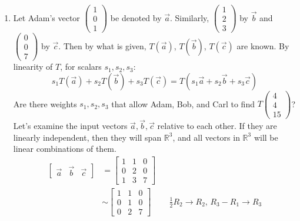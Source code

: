 \documentclass[10pt,letterpaper,final]{report}
\newcommand{\reason}[1]{&& \text{#1}}
\begin{document}
\begin{enumerate}[label=(\alph*)]
  \item Let Adam's vector $\begin{pmatrix}1\\0\\1\end{pmatrix}$ be denoted by $\vec{a}$. Similarly, $\begin{pmatrix}1\\2\\3\end{pmatrix}$ by $\vec{b}$ and $\begin{pmatrix}0\\0\\7\end{pmatrix}$ by $\vec{c}$. Then by what is given, $T(\vec{a})$, $T(\vec{b})$, $T(\vec{c})$ are known. By linearity of $T$, for scalars $s_1, s_2, s_3$:
        \begin{equation}
          s_1T(\vec{a}) + s_2T(\vec{b}) + s_3T(\vec{c}) = T(s_1\vec{a} + s_2\vec{b} + s_3\vec{c}) \label{eq:linear_combination}
        \end{equation}
        Are there weights $s_1, s_2, s_3$ that allow Adam, Bob, and Carl to find $T\begin{pmatrix}4\\4\\15\end{pmatrix}$? Let's examine the input vectors $\vec{a}, \vec{b}, \vec{c}$ relative to each other. If they are linearly independent, then they will span $\mathbb{R}^3$, and all vectors in $\mathbb{R}^3$ will be linear combinations of them.
        \begin{align*}
          \begin{bmatrix}
            \vec{a} & \vec{b} & \vec{c}
          \end{bmatrix}
           & = \begin{bmatrix}
                 1 & 1 & 0 \\
                 0 & 2 & 0 \\
                 1 & 3 & 7
               \end{bmatrix}                                                        \\[1ex]
           & \sim \begin{bmatrix}
                    1 & 1 & 0 \\
                    0 & 1 & 0 \\
                    0 & 2 & 7
                  \end{bmatrix} \reason{$\frac{1}{2}R_2 \to R_2$, $R_3 - R_1 \to R_3$} \\[1ex]

\end{align*}
\end{enumerate}
\end{document}
